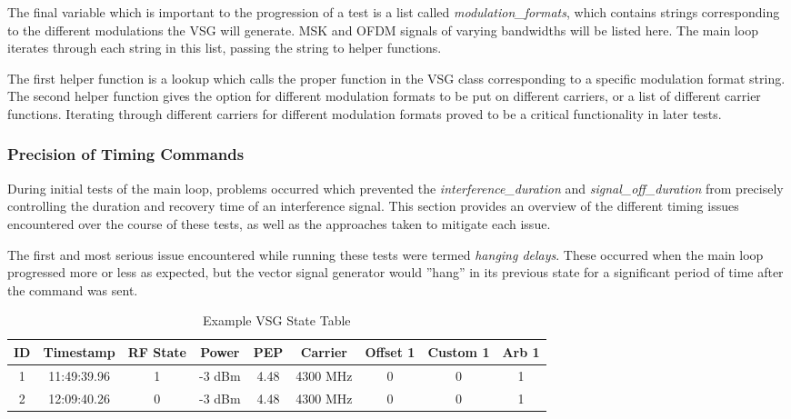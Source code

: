 The final variable which is important to the progression of a test is a list called \textit{modulation\_formats}, which contains strings corresponding to the different modulations the VSG will generate. MSK and OFDM signals of varying bandwidths will be listed here. The main loop iterates through each string in this list, passing the string to helper functions. 

The first helper function is a lookup which calls the proper function in the VSG class corresponding to a specific modulation format string. The second helper function gives the option for different modulation formats to be put on different carriers, or a list of different carrier functions. Iterating through different carriers for different modulation formats proved to be a critical functionality in later tests.

\subsubsection{Precision of Timing Commands}\label{subsub:timing}
During initial tests of the main loop, problems occurred which prevented the \textit{interference\_duration} and \textit{signal\_off\_duration} from precisely controlling the duration and recovery time of an interference signal. This section provides an overview of the different timing issues encountered over the course of these tests, as well as the approaches taken to mitigate each issue. 
 
The first and most serious issue encountered while running these tests were termed \textit{hanging delays}. These occurred when the main loop progressed more or less as expected, but the vector signal generator would ''hang'' in its previous state for a significant period of time after the command was sent. 



\begin{table}[]
\centering
\begin{tabular}{@{}ccccccccc@{}}
\toprule
ID & Timestamp   & RF State & Power  & PEP  & Carrier  & Offset 1 & Custom 1 & Arb 1 \\ \midrule
1  & 11:49:39.96 & 1        & -3 dBm & 4.48 & 4300 MHz & 0        & 0        & 1     \\
2  & 12:09:40.26 & 0        & -3 dBm & 4.48 & 4300 MHz & 0        & 0        & 1     \\ \bottomrule


\end{tabular}
\caption{Example VSG State Table}
\label{tab:VSG_State}
\end{table}
 
